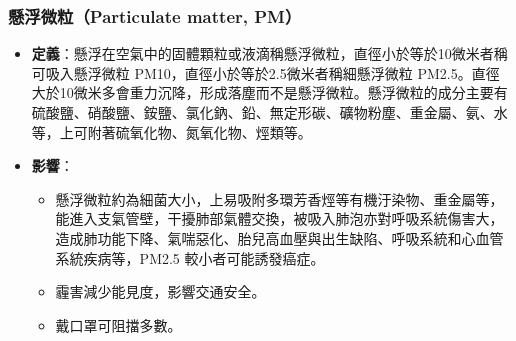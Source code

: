 \documentclass[a4paper,12pt]{report}
\begin{document}
\subsubsection{懸浮微粒（Particulate matter, PM）}
\begin{itemize}
\item \textbf{定義}：懸浮在空氣中的固體顆粒或液滴稱懸浮微粒，直徑小於等於10微米者稱可吸入懸浮微粒 PM10，直徑小於等於2.5微米者稱細懸浮微粒 PM2.5。直徑大於10微米多會重力沉降，形成落塵而不是懸浮微粒。懸浮微粒的成分主要有硫酸鹽、硝酸鹽、銨鹽、氯化鈉、鉛、無定形碳、礦物粉塵、重金屬、氨、水等，上可附著硫氧化物、氮氧化物、烴類等。
    \item \textbf{影響}：
    \begin{itemize}
        \item 懸浮微粒約為細菌大小，上易吸附多環芳香烴等有機汙染物、重金屬等，能進入支氣管壁，干擾肺部氣體交換，被吸入肺泡亦對呼吸系統傷害大，造成肺功能下降、氣喘惡化、胎兒高血壓與出生缺陷、呼吸系統和心血管系統疾病等，PM2.5 較小者可能誘發癌症。
        \item 霾害減少能見度，影響交通安全。
        \item 戴口罩可阻擋多數。
    \end{itemize}
\end{itemize}
\end{document}

